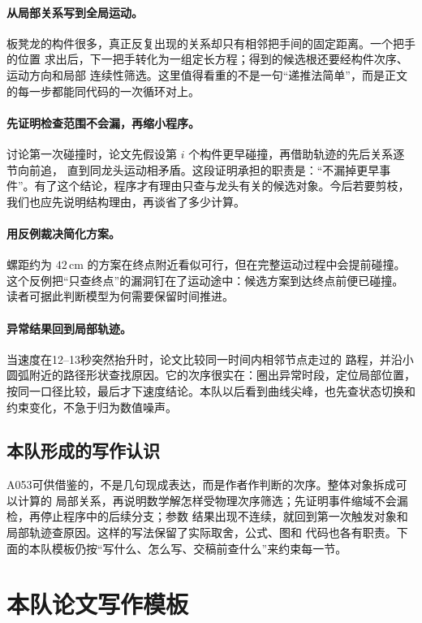 \documentclass[UTF8,zihao=-4]{ctexart}
\begin{document}
\paragraph{从局部关系写到全局运动。}
板凳龙的构件很多，真正反复出现的关系却只有相邻把手间的固定距离。一个把手的位置
求出后，下一把手转化为一组定长方程；得到的候选根还要经构件次序、运动方向和局部
连续性筛选。这里值得看重的不是一句“递推法简单”，而是正文的每一步都能同代码的一次循环对上。

\paragraph{先证明检查范围不会漏，再缩小程序。}
讨论第一次碰撞时，论文先假设第 $i$ 个构件更早碰撞，再借助轨迹的先后关系逐节向前追，
直到同龙头运动相矛盾。这段证明承担的职责是：“不漏掉更早事件”。有了这个结论，程序才有理由只查与龙头有关的候选对象。今后若要剪枝，
我们也应先说明结构理由，再谈省了多少计算。

\paragraph{用反例裁决简化方案。}
螺距约为 $42\,\mathrm{cm}$ 的方案在终点附近看似可行，但在完整运动过程中会提前碰撞。
这个反例把“只查终点”的漏洞钉在了运动途中：候选方案到达终点前便已碰撞。
读者可据此判断模型为何需要保留时间推进。

\paragraph{异常结果回到局部轨迹。}
当速度在12--13秒突然抬升时，论文比较同一时间内相邻节点走过的
路程，并沿小圆弧附近的路径形状查找原因。它的次序很实在：圈出异常时段，定位局部位置，
按同一口径比较，最后才下速度结论。本队以后看到曲线尖峰，也先查状态切换和约束变化，不急于归为数值噪声。

\subsection{本队形成的写作认识}

A053可供借鉴的，不是几句现成表达，而是作者作判断的次序。整体对象拆成可以计算的
局部关系，再说明数学解怎样受物理次序筛选；先证明事件缩域不会漏检，再停止程序中的后续分支；参数
结果出现不连续，就回到第一次触发对象和局部轨迹查原因。这样的写法保留了实际取舍，公式、图和
代码也各有职责。下面的本队模板仍按“写什么、怎么写、交稿前查什么”来约束每一节。

\section{本队论文写作模板}
\end{document}
